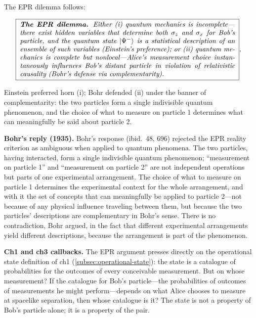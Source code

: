 The EPR dilemma follows:
\begin{linenomath}
\begin{equation}
\boxed{\;
\begin{minipage}{0.9\textwidth}
\itshape
\textbf{The EPR dilemma.} Either (i) quantum mechanics is incomplete---there exist hidden variables that determine both $\sigma_z$ and $\sigma_x$ for Bob's particle, and the quantum state $\ket{\Psi^-}$ is a statistical description of an ensemble of such variables (Einstein's preference); or (ii) quantum mechanics is complete but nonlocal---Alice's measurement choice instantaneously influences Bob's distant particle in violation of relativistic causality (Bohr's defense via complementarity).
\end{minipage}
\;},
\label{eq:epr-dilemma}
\end{equation}
\end{linenomath}
Einstein preferred horn (i); Bohr defended (ii) under the banner of complementarity: the two particles form a single indivisible quantum phenomenon, and the choice of what to measure on particle 1 determines what can meaningfully be said about particle 2.

\medskip\noindent\textbf{Bohr's reply (1935).}
Bohr's response (ibid.\ 48, 696) rejected the EPR reality criterion as ambiguous when applied to quantum phenomena. The two particles, having interacted, form a single indivisible quantum phenomenon; ``measurement on particle 1'' and ``measurement on particle 2'' are not independent operations but parts of one experimental arrangement. The choice of what to measure on particle 1 determines the experimental context for the whole arrangement, and with it the set of concepts that can meaningfully be applied to particle 2---not because of any physical influence traveling between them, but because the two particles' descriptions are complementary in Bohr's sense. There is no contradiction, Bohr argued, in the fact that different experimental arrangements yield different descriptions, because the arrangement is part of the phenomenon.

\medskip\noindent\textbf{Ch1 and ch3 callbacks.}
The EPR argument presses directly on the operational state definition of ch1 (\ref{subsec:operational-state}): the state is a catalogue of probabilities for the outcomes of every conceivable measurement. But on whose measurement? If the catalogue for Bob's particle---the probabilities of outcomes of measurements he might perform---depends on what Alice chooses to measure at spacelike separation, then whose catalogue is it? The state is not a property of Bob's particle alone; it is a property of the pair.


